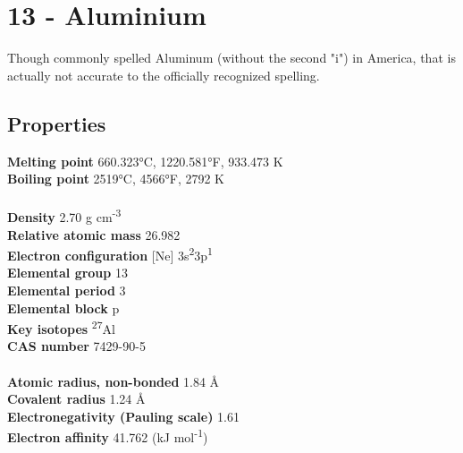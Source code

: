 \section{13 - Aluminium}
\label{sec:elem-aluminium}
Though commonly spelled Aluminum (without the second "i") in America, that is actually not accurate to the officially recognized spelling.
\subsection{Properties}
\textbf{Melting point} 660.323°C, 1220.581°F, 933.473 K\\
\textbf{Boiling point} 2519°C, 4566°F, 2792 K\\
\\
\textbf{Density} 2.70 g cm\textsuperscript{-3}\\
\textbf{Relative atomic mass} 26.982\\
\textbf{Electron configuration} [Ne] 3s\textsuperscript{2}3p\textsuperscript{1}\\
\textbf{Elemental group} 13\\
\textbf{Elemental period} 3\\
\textbf{Elemental block} p\\
\textbf{Key isotopes} \textsuperscript{27}Al\\
\textbf{CAS number} 7429-90-5\\
\\
\textbf{Atomic radius, non-bonded} 1.84 Å\\
\textbf{Covalent radius} 1.24 Å\\
\textbf{Electronegativity (Pauling scale)} 1.61\\
\textbf{Electron affinity} 41.762 (kJ mol\textsuperscript{-1})\\